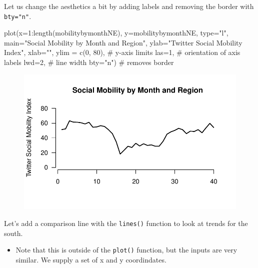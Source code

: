 \documentclass[
  letterpaper,
  DIV=11,
  numbers=noendperiod]{scrreprt}
\newenvironment{Shaded}{\begin{snugshade}}{\end{snugshade}}
\newcommand{\AttributeTok}[1]{\textcolor[rgb]{0.40,0.45,0.13}{#1}}
\newcommand{\CommentTok}[1]{\textcolor[rgb]{0.37,0.37,0.37}{#1}}
\newcommand{\DecValTok}[1]{\textcolor[rgb]{0.68,0.00,0.00}{#1}}
\newcommand{\FunctionTok}[1]{\textcolor[rgb]{0.28,0.35,0.67}{#1}}
\newcommand{\NormalTok}[1]{\textcolor[rgb]{0.00,0.23,0.31}{#1}}
\newcommand{\SpecialCharTok}[1]{\textcolor[rgb]{0.37,0.37,0.37}{#1}}
\newcommand{\StringTok}[1]{\textcolor[rgb]{0.13,0.47,0.30}{#1}}
\providecommand{\tightlist}{%
  \setlength{\itemsep}{0pt}\setlength{\parskip}{0pt}}\usepackage{longtable,booktabs,array}
\begin{document}
Let us change the aesthetics a bit by adding labels and removing the
border with \texttt{bty="n"}.

\begin{Shaded}
\begin{Highlighting}[]
\FunctionTok{plot}\NormalTok{(}\AttributeTok{x=}\DecValTok{1}\SpecialCharTok{:}\FunctionTok{length}\NormalTok{(mobilitybymonthNE),}
     \AttributeTok{y=}\NormalTok{mobilitybymonthNE,}
     \AttributeTok{type=}\StringTok{"l"}\NormalTok{, }
     \AttributeTok{main=}\StringTok{"Social Mobility by Month and Region"}\NormalTok{,}
     \AttributeTok{ylab=}\StringTok{"Twitter Social Mobility Index"}\NormalTok{,}
     \AttributeTok{xlab=}\StringTok{""}\NormalTok{,}
     \AttributeTok{ylim =} \FunctionTok{c}\NormalTok{(}\DecValTok{0}\NormalTok{, }\DecValTok{80}\NormalTok{), }\CommentTok{\# y{-}axis limits}
     \AttributeTok{las=}\DecValTok{1}\NormalTok{, }\CommentTok{\# orientation of axis labels}
     \AttributeTok{lwd=}\DecValTok{2}\NormalTok{, }\CommentTok{\# line width}
     \AttributeTok{bty=}\StringTok{"n"}\NormalTok{) }\CommentTok{\# removes border}
\end{Highlighting}
\end{Shaded}

\begin{figure}[H]

{\centering \includegraphics{05-Causalityii_files/figure-pdf/unnamed-chunk-14-1.pdf}

}

\end{figure}

Let's add a comparison line with the \texttt{lines()} function to look
at trends for the south.

\begin{itemize}
\tightlist
\item
  Note that this is outside of the \texttt{plot()} function, but the
  inputs are very similar. We supply a set of x and y coordindates.
\end{itemize}
\end{document}
